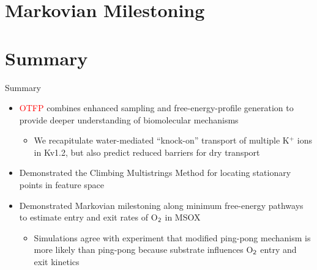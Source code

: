 \documentclass[10pt]{beamer}
\begin{document}


\section{Markovian Milestoning}



% 









% 







% 

\section{Summary}

\begin{frame}[fragile]{Summary}
  \begin{itemize}
  \item \textcolor{red}{OTFP} combines enhanced sampling and free-energy-profile generation to provide deeper understanding of biomolecular mechanisms
  \begin{itemize}
  \item We recapitulate water-mediated ``knock-on'' transport of multiple K$^+$ ions in Kv1.2, but also predict reduced barriers for dry transport
  \end{itemize}
  \item Demonstrated the \textcolor{magenta!80!black}{Climbing Multistrings Method} for locating stationary points in feature space
  \item Demonstrated \textcolor{green!80!black}{Markovian milestoning} along minimum free-energy pathways to estimate entry and exit rates of O$_{\sf 2}$ in MSOX
  \begin{itemize}
  \item Simulations agree with experiment that modified ping-pong mechanism is more likely than ping-pong because substrate influences O$_{\sf 2}$ entry and exit kinetics
\end{itemize}
\end{itemize}
\end{frame}


\end{document}
